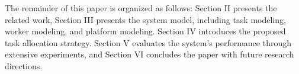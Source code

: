 The remainder of this paper is organized as follows: Section II presents the related work, Section III presents the system model, including task modeling, worker modeling, and platform modeling. Section IV introduces the proposed task allocation strategy. Section V evaluates the system's performance through extensive experiments, and Section VI concludes the paper with future research directions.